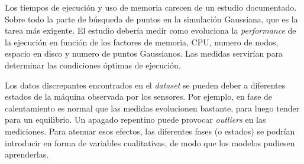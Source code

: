 \documentclass[11pt,spanish,listoffigures,listoftables]{tfgetsinf}
\begin{document}
Los tiempos de ejecución y uso de memoria carecen de un estudio documentado. Sobre todo la parte de búsqueda de puntos en la simulación Gaussiana, que es la tarea más exigente. El estudio debería medir como evoluciona la {\em performance} de la ejecución en función de los factores de memoria, CPU, numero de nodos, espacio en disco y numero de puntos Gaussianos. Las medidas servirían para determinar las condiciones óptimas de ejecución.

Los datos discrepantes encontrados en el {\em dataset} se pueden deber a diferentes estados de la máquina observada por los sensores. Por ejemplo, en fase de calentamiento es normal que las medidas evolucionen bastante, para luego tender para un equilibrio. Un apagado repentino puede provocar {\em outliers} en las mediciones. Para atenuar esos efectos, las diferentes fases (o estados) se podrían introducir en forma de variables cualitativas, de modo que los modelos pudiesen aprenderlas. 

\end{document}
